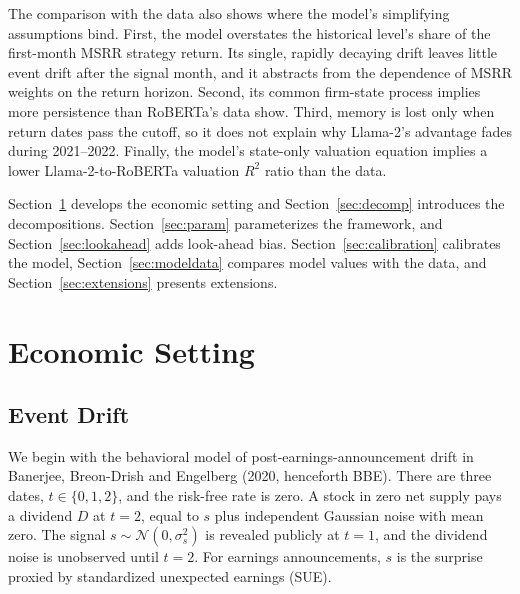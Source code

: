 \documentclass[11pt,letterpaper]{article}
\let\oldsubsection\subsection
\renewcommand{\subsection}{\FloatBarrier\oldsubsection}
\theoremstyle{remark}
\begin{document}
The comparison with the data also shows where the model's simplifying assumptions bind. First, the model overstates the historical level's share of the first-month MSRR strategy return. Its single, rapidly decaying drift leaves little event drift after the signal month, and it abstracts from the dependence of MSRR weights on the return horizon. Second, its common firm-state process implies more persistence than RoBERTa's data show. Third, memory is lost only when return dates pass the cutoff, so it does not explain why Llama-2's advantage fades during 2021--2022. Finally, the model's state-only valuation equation implies a lower Llama-2-to-RoBERTa valuation $R^2$ ratio than the data.

Section~\ref{sec:setting} develops the economic setting and Section~\ref{sec:decomp} introduces the decompositions. Section~\ref{sec:param} parameterizes the framework, and Section~\ref{sec:lookahead} adds look-ahead bias. Section~\ref{sec:calibration} calibrates the model, Section~\ref{sec:modeldata} compares model values with the data, and Section~\ref{sec:extensions} presents extensions.

\section{Economic Setting}\label{sec:setting}

\subsection{Event Drift}

We begin with the behavioral model of post-earnings-announcement drift in Banerjee, Breon-Drish and Engelberg (2020, henceforth BBE). There are three dates, $t\in\{0,1,2\}$, and the risk-free rate is zero. A stock in zero net supply pays a dividend $D$ at $t=2$, equal to $s$ plus independent Gaussian noise with mean zero. The signal $s\sim\mathcal N(0,\sigma_s^2)$ is revealed publicly at $t=1$, and the dividend noise is unobserved until $t=2$. For earnings announcements, $s$ is the surprise proxied by standardized unexpected earnings (SUE).
\end{document}
